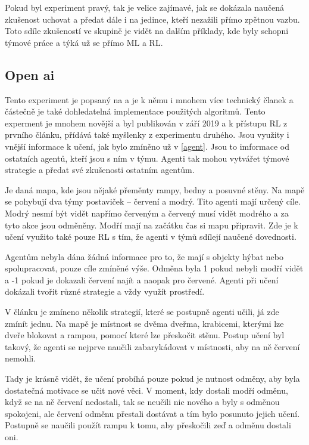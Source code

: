 \documentclass{article}
\begin{document}
Pokud byl experiment pravý, tak je velice zajímavé, jak se dokázala naučená zkušenost uchovat a předat dále i na jedince, kteří nezažili přímo zpětnou vazbu. Toto sdíle zkušeností ve skupině je vidět na dalším příklady, kde byly schopni týmové práce a týká už se přímo ML a RL.


\subsection{Open ai}
\label{openai}
Tento experiment je popsaný na \cite{openAI} a je k němu i mnohem více technický članek \cite{baker2019emergent} a částečně je také dohledatelná implementace použitých algoritmů. Tento experment je mnohem novější a byl publikován v září 2019 a k přístupu RL z prvního článku, přídává také myšlenky z experimentu druhého. Jsou využity i vnější informace k učení, jak bylo zmíněno už v \ref{agent}. Jsou to imformace od ostatních agentů, kteří jsou s ním v týmu. Agenti tak mohou vytvářet týmové strategie a předat své zkušenosti ostatním agentům. 

Je daná mapa, kde jsou nějaké přeměnty rampy, bedny a posuvné stěny. Na mapě se pohybují dva týmy postaviček -- červení a modrý. Tito agenti mají určený cíle. Modrý nesmí být vidět napřímo červeným a červený musí vidět modrého a za tyto akce jsou odměněny. Modří mají na začátku čas si mapu připravit. Zde je k učení využito také pouze RL s tím, že agenti v týmů sdílejí naučené dovednosti. 

Agentům nebyla dána žádná informace pro to, že mají s objekty hýbat nebo spolupracovat, pouze cíle zmíněné výše. Odměna byla 1 pokud nebyli modří vidět a -1 pokud je dokazali červení najít a naopak pro červené. Agenti při učení dokázali tvořit různé strategie a vždy využít prostředí. 

V článku je zmíneno několik strategií, které se postupně agenti učili, já zde zmínít jednu. Na mapě je místnost se dvěma dveřma, krabicemi, kterými lze dveře blokovat a rampou, pomocí které lze přeskočit stěnu. Postup učení byl takový, že agenti se nejprve naučili zabarykádovat v místnosti, aby na ně červení nemohli. 

Tady je krásně vidět, že učení probíhá pouze pokud je nutnost odměny, aby byla dostatečná motivace se učit nové věci. V moment, kdy dostali modří odměnu, když se na ně červení nedostali, tak se neučili nic nového a byly s  odměnou spokojeni, ale červení odměnu přestali dostávat a tím bylo posunuto jejich učení. Postupně se naučili použít rampu k tomu, aby přeskočili zeď a odměnu dostali oni. 
\end{document}
